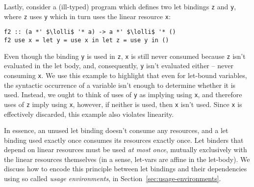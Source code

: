 \documentclass[acmsmall,review,anonymous,screen]{acmart}
\newcommand{\incode}[1]{\lstinline{#1}}
\newcommand{\parawith}[1]{\paragraph{\emph{#1}}}
\newcommand{\lolli}{\multimap}
\begin{document}
Lastly, consider a (ill-typed) program which defines two let bindings \incode{z} and \incode{y}, where
\incode{z} uses \incode{y} which in turn uses the linear resource \incode{x}:
%
\begin{noway}
\begin{lstlisting}
f2 :: (a *' $\lolli$ '* a) -> a *' $\lolli$ '* ()
f2 use x = let y = use x in let z = use y in ()
\end{lstlisting}
\end{noway}
%
Even though the binding \incode{y} is used in \incode{z}, \incode{x} is still never consumed because
\incode{z} isn't evaluated in the let body, and, consequently, \incode{y} isn't evaluated
either -- never consuming \incode{x}. We use this example to highlight that even for
let-bound variables, the syntactic occurrence of a variable isn't enough to
determine whether it is used. Instead, we ought to think of uses of \incode{y} as
implying using \incode{x}, and therefore uses of \incode{z} imply using \incode{x}, however, if
neither is used, then \incode{x} isn't used. Since \incode{x} is effectively discarded, this
example also violates linearity.

In essence, an unused let binding doesn't consume any
resources, and a let binding used exactly once consumes its resources exactly
once. Let binders that depend on linear resources must be used \emph{at most
once}, mutually exclusively with the linear resources themselves
(in a sense, let-vars are affine in the let-body).
%
%
We discuss how to encode this principle between let bindings and their dependencies using so called \emph{usage
environments}, in Section~\ref{sec:usage-environments}.

\end{document}
